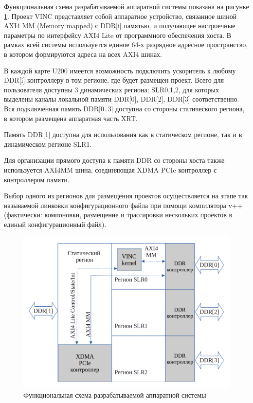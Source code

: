 Функциональная схема разрабатываемой аппаратной системы показана на рисунке \ref{img:scheme}. Проект VINC представляет собой аппаратное устройство, связанное шиной AXI4 MM (Memory mapped) с DDR[i] памятью, и получающее настроечные параметры по интерфейсу AXI4 Lite от программного обеспечения хоста. В рамках всей системы используется единое 64-х разрядное адресное пространство, в котором формируются адреса на всех AXI4 шинах.

В каждой карте U200 имеется возможность подключить ускоритель к любому DDR[i] контроллеру в том регионе, где будет размещен проект. Всего для пользователя доступны 3 динамических региона: SLR0,1,2, для которых выделены каналы локальной памяти DDR[0], DDR[2], DDR[3] соответственно. Вся подключенная память DDR[0..3] доступна со стороны статического региона, в котором размещена аппаратная часть XRT.

Память DDR[1] доступна для использования как в статическом регионе, так и в динамическом регионе SLR1.

Для организации прямого доступа к памяти DDR со стороны хоста также используется AXI4MM шина, соединяющая XDMA PCIe контроллер с контроллером памяти.

Выбор одного из регионов для размещения проектов осуществляется на этапе так называемой линковки конфигурационного файла при помощи компилятора v++(фактически: компоновки, размещение и трассировки нескольких проектов в единый конфигурационный файл).

\begin{figure}[H]
	\begin{center}
		\includegraphics[scale=0.3]{img/scheme.png}
	\end{center}
	\captionsetup{justification=centering}
	\caption{Функциональная схема разрабатываемой аппаратной системы}
	\label{img:scheme}
\end{figure}

